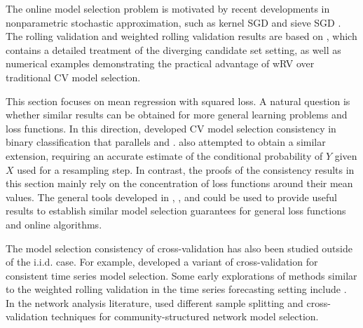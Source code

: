 \documentclass[11pt]{article}
\theoremstyle{plain}
\begin{document}
The online model selection problem is motivated by recent developments in nonparametric stochastic approximation, such as kernel SGD \citep{kivinen2004online,dieuleveut2016nonparametric} and sieve SGD \citep{zhang2022sieve,quan2024optimal}.
The rolling validation and weighted rolling validation results are based on \cite{zhang2023online}, which contains a detailed treatment of the diverging candidate set setting, as well as numerical examples demonstrating the practical advantage of wRV over traditional CV model selection.


This section focuses on mean regression with squared loss.  A natural question is whether similar results can be obtained for more general learning problems and loss functions.  In this direction, \cite{yang2006comparing} developed CV model selection consistency in binary classification that parallels  and \cite{yang2007consistency}. 
\cite{wang2006estimation} also attempted to obtain a similar extension, requiring an accurate estimate of the conditional probability of $Y$ given $X$ used for a resampling step.  In contrast, the proofs of the consistency results in this section mainly rely on the concentration of loss functions around their mean values.  The general tools developed in , , and  could be used to provide useful results to establish similar model selection guarantees for general loss functions and online algorithms.


The model selection consistency of cross-validation has also been studied outside of the i.i.d. case.  For example, \cite{racine2000consistent} developed a variant of cross-validation for consistent time series model selection. Some early explorations of methods similar to the weighted rolling validation in the time series forecasting setting include \cite{wei1992predictive,ing2007accumulated}. 
In the network analysis literature, \cite{chen2018network,li2020network,qin2022consistent} used different sample splitting and cross-validation techniques for community-structured network model selection.
\newpage
\end{document}
